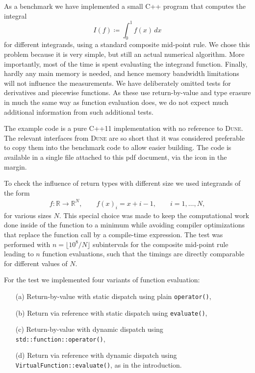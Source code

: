 \documentclass[11pt,
                 numbers=noenddot,
                 headings=normal,
                 DIV16, BCOR10mm]{scrartcl}
\newcommand{\cpp}{\lstinline}
\theoremstyle{remark}
\newcommand{\dune}{\textsc{Dune}\xspace}
\begin{document}
As a benchmark we have implemented a small C++ program that computes the integral
\begin{equation*}
    I(f) \coloneqq \int_0^{1} f(x)\,dx
\end{equation*}
for different integrands, using a standard composite mid-point rule.
We chose this problem because it is very simple, but still an actual numerical algorithm.  More importantly,
most of the time is spent evaluating the integrand function. Finally, hardly any main memory is needed,
and hence memory bandwidth limitations will not influence the measurements.
We have deliberately omitted tests for derivatives and piecewise functions.
As these use return-by-value and type erasure in much the same way as function evaluation does,
we do not expect much additional information from such additional tests.

The example code is a pure C++11 implementation with no reference to \dune.  The relevant interfaces from \dune
are so short that it was considered preferable to copy them into the benchmark code to allow easier building.
The code is available in a single file attached to this pdf document, via the icon in the margin.%
%


To check the influence of return types with different size we used integrands of the form
\begin{align*}
    f:\mathbb{R} \to \mathbb{R}^N, \qquad f(x)_i = x+i-1, \qquad i=1,\dots,N,
\end{align*}
for various sizes $N$. This special choice was made to keep the computational work done
inside of the function to a minimum while avoiding compiler optimizations that replace the
function call by a compile-time expression.
The test was performed with $n= \lfloor 10^8/N\rfloor$ subintervals for the composite mid-point
rule leading to $n$ function evaluations, such that the timings are directly comparable for different
values of $N$.

For the test we implemented four variants of function evaluation:
\begin{enumerate}
    \item[(a)]
        Return-by-value with static dispatch using plain \cpp{operator()},
    \item[(b)]
        Return via reference with static dispatch using \cpp{evaluate()},
    \item[(c)]
        Return-by-value with dynamic dispatch using \cpp{std::function::operator()},
    \item[(d)]
        Return via reference with dynamic dispatch using \cpp{VirtualFunction::evaluate()},
        as in the introduction.
\end{enumerate}
\end{document}
